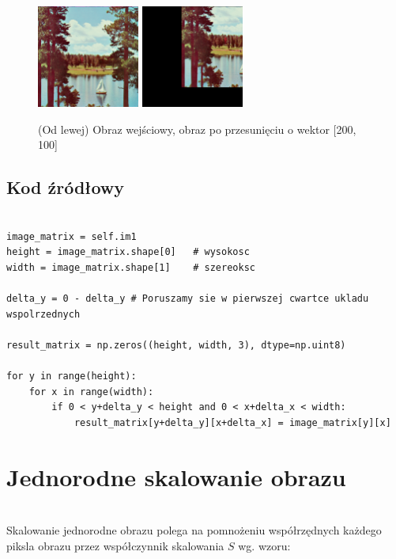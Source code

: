 \documentclass[final,a4paper,openany,12pt]{mwbk}
\begin{document}
\begin{figure}[H]
	\begin{center}
		\includegraphics[width=0.3\textwidth]{2/2Geo_Move_Original}
		\includegraphics[width=0.3\textwidth]{2/2Geo_Move_Result}
	\end{center}
	\caption{(Od lewej) Obraz wejściowy, obraz po przesunięciu o wektor [200, 100] }
\end{figure}

\subsection*{Kod źródłowy}

\begin{lstlisting}[caption=Przemieszczenie obrazu o zadany wektor]

image_matrix = self.im1
height = image_matrix.shape[0]   # wysokosc
width = image_matrix.shape[1]    # szereoksc

delta_y = 0 - delta_y # Poruszamy sie w pierwszej cwartce ukladu wspolrzednych

result_matrix = np.zeros((height, width, 3), dtype=np.uint8)

for y in range(height):
    for x in range(width):  
        if 0 < y+delta_y < height and 0 < x+delta_x < width:
            result_matrix[y+delta_y][x+delta_x] = image_matrix[y][x]

\end{lstlisting}

\section{ Jednorodne skalowanie obrazu}
\hfill\\
\indent
Skalowanie jednorodne obrazu polega na pomnożeniu współrzędnych każdego piksla obrazu przez współczynnik skalowania $S$ wg. wzoru:
	
\end{document}

